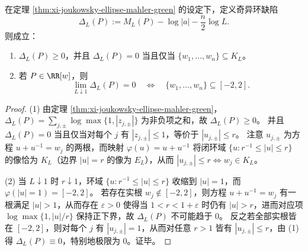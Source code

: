 \begin{theorem}\label{thm:xi-joukowsky-ellipse-defect-nonnegativity-interval-limit}
在定理 \ref{thm:xi-joukowsky-ellipse-mahler-green} 的设定下，定义奇异环缺陷
\[
\Delta_L(P):=M_L(P)-\log|a|-\frac{n}{2}\log L.
\]
则成立：
\begin{enumerate}
  \item \(\Delta_L(P)\ge 0\)，并且 \(\Delta_L(P)=0\) 当且仅当 \(\{w_1,\dots,w_n\}\subseteq K_L\)。
  \item 若 \(P\in\RR[w]\)，则
  \[
  \lim_{L\downarrow 1}\Delta_L(P)=0
  \quad\Longleftrightarrow\quad
  \{w_1,\dots,w_n\}\subseteq[-2,2].
  \]
\end{enumerate}
\end{theorem}
\begin{proof}
(1) 由定理 \ref{thm:xi-joukowsky-ellipse-mahler-green}，
\(
\Delta_L(P)=\sum_{j,\pm}\log\max\{1,|z_{j,\pm}|\}
\)
为非负项之和，故 \(\Delta_L(P)\ge 0\)。
并且 \(\Delta_L(P)=0\) 当且仅当对每个 \(j\) 有 \(|z_{j,\pm}|\le 1\)，等价于 \(|u_{j,\pm}|\le r\)。
注意 \(u_{j,\pm}\) 为方程 \(u+u^{-1}=w_j\) 的两根，而映射 \(\varphi(u)=u+u^{-1}\) 将闭环域 \(\{u:r^{-1}\le |u|\le r\}\) 的像恰为 \(K_L\)（边界 \(|u|=r\) 的像为 \(E_L\)），从而 \(|u_{j,\pm}|\le r\iff w_j\in K_L\)。

(2) 当 \(L\downarrow 1\) 时 \(r\downarrow 1\)，环域 \(\{u:r^{-1}\le |u|\le r\}\) 收缩到 \(|u|=1\)，而 \(\varphi(|u|=1)=[-2,2]\)。
若存在实根 \(w_j\notin[-2,2]\)，则方程 \(u+u^{-1}=w_j\) 有一根满足 \(|u|>1\)，从而存在 \(\varepsilon>0\) 使得当 \(1<r<1+\varepsilon\) 时仍有 \(|u|>r\)，进而对应项 \(\log\max\{1,|u|/r\}\) 保持正下界，故 \(\Delta_L(P)\) 不可能趋于 \(0\)。
反之若全部实根皆在 \([-2,2]\)，则对每个 \(j\) 有 \(|u_{j,\pm}|=1\)，从而对任意 \(r>1\) 皆有 \(|u_{j,\pm}|\le r\)，由 (1) 得 \(\Delta_L(P)\equiv 0\)，特别地极限为 \(0\)。证毕。
\end{proof}

